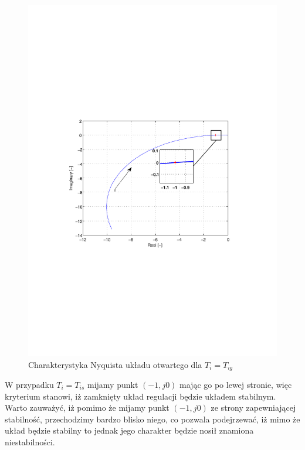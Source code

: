 \documentclass[12pt]{article}
\begin{document}
\begin{figure}[!htb]
	\begin{center}
		\includegraphics[trim=5cm 9cm 5cm 9cm]{../res/img/2-2-0,5_nyq.pdf} 
	\end{center}
	\caption{Charakterystyka Nyquista układu otwartego dla $T_{i}=T_{ig}$}
\end{figure}

\newpage

W przypadku $T_{i}=T_{is}$ mijamy punkt $(-1, j0)$ mając go po lewej stronie, więc
kryterium stanowi, iż zamknięty układ regulacji będzie układem stabilnym. Warto
zauważyć, iż pomimo że mijamy punkt $(-1, j0)$ ze strony zapewniającej
stabilność, przechodzimy bardzo blisko niego, co pozwala podejrzewać, iż mimo że
układ będzie stabilny to jednak jego charakter będzie nosił znamiona
niestabilności.
\end{document}
